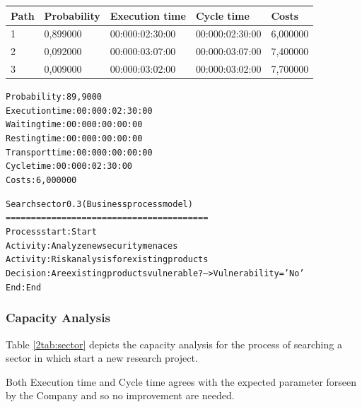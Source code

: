 \begin{table}[ht!]
\centering
\begin{tabular}{|l|l|l|l|l|}
\hline
Path&Probability&Execution time&Cycle time&Costs\\
\hline
1&0,899000&00:000:02:30:00&00:000:02:30:00&6,000000\\
\hline
2&0,092000&00:000:03:07:00&00:000:03:07:00&7,400000\\
\hline
3&0,009000&00:000:03:02:00&00:000:03:02:00&7,700000\\
\hline
\end{tabular}
\end{table}

\begin{alltt}
Probability:   89,9000%
Execution time:  00:000:02:30:00
Waiting time:  00:000:00:00:00
Resting time:  00:000:00:00:00
Transport time:  00:000:00:00:00
Cycle time:  00:000:02:30:00
Costs:  6,000000

Search sector 0.3 (Business process model)
========================================
Process start: Start
Activity: Analyze new security menaces
Activity: Risk analysis for existing products
Decision: Are existing products vulnerable? --> Vulnerability = 'No'
End: End
\end{alltt}

\subsubsection{Capacity Analysis}
Table \ref{2tab:sector} depicts the capacity analysis for the process of
searching a sector in which start a new research project.

Both Execution time and Cycle time agrees with the expected parameter forseen by the Company and so no improvement are needed.

